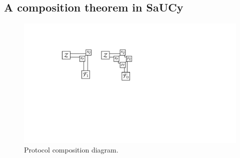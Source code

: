 %
%


\subsection{A composition theorem in SaUCy}
\label{subsec:composition}

\begin{figure}
  \centering
  \includegraphics[width=0.85\linewidth]{graphics/protocol-composition}
  \caption{Protocol composition diagram.}
  \label{fig:protocol-composition}
\end{figure}

